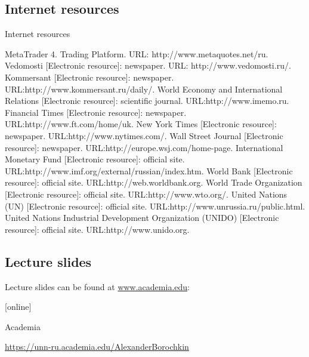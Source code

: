 \documentclass[international_finance_p1.tex]{subfiles}
\begin{document}
\subsection*{Internet resources}
\begin{frame}[allowframebreaks]{Internet resources}
\begin{thebibliography}{10}
  \beamertemplatearticlebibitems
	MetaTrader 4. Trading Platform. 
	\newblock URL: http://www.metaquotes.net/ru.
	Vedomosti [Electronic resource]: newspaper. 
	\newblock URL: http://www.vedomosti.ru/.
  \bibitem{}
	Kommersant [Electronic resource]: newspaper.
	\newblock URL:http://www.kommersant.ru/daily/.
  \bibitem{}
	World Economy and International Relations [Electronic resource]: scientific journal.
	\newblock URL:http://www.imemo.ru.
  \bibitem{}
	Financial Times  [Electronic resource]: newspaper. 
	\newblock URL:http://www.ft.com/home/uk.
  \bibitem{}
	New York Times  [Electronic resource]: newspaper.
	\newblock URL:http://www.nytimes.com/.
  \bibitem{}
	Wall Street Journal [Electronic resource]: newspaper.
	\newblock URL:http://europe.wsj.com/home-page.
  \bibitem{}
	International Monetary Fund  [Electronic resource]: official site.
	\newblock URL:http://www.imf.org/external/russian/index.htm.
  \bibitem{}
	World Bank [Electronic resource]: official site.
	\newblock URL:http://web.worldbank.org.
  \bibitem{}
	World Trade Organization [Electronic resource]: official site.
	\newblock URL:http://www.wto.org/.
  \bibitem{}
	United Nations (UN) [Electronic resource]: official site.
	\newblock URL:http://www.unrussia.ru/public.html.
  \bibitem{}
	United Nations Industrial Development Organization (UNIDO) [Electronic resource]: official site. 
	\newblock URL:http://www.unido.org.
	\end{thebibliography}

\end{frame}

\subsection*{Lecture slides}
\begin{frame}
Lecture slides can be found at \url{www.academia.edu}:
\begin{thebibliography}{10}
	
	[online]
	
	Academia
	
	\footnotesize{\url{https://unn-ru.academia.edu/AlexanderBorochkin}}
\end{thebibliography}
\end{frame}
\end{document}
